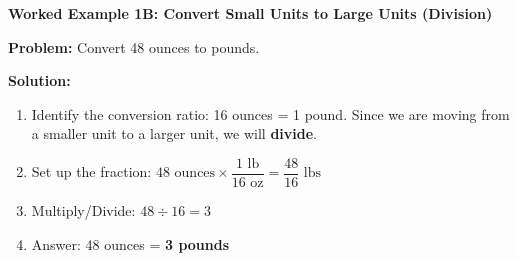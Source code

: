 \documentclass[12pt, letterpaper, fleqn]{article}
\begin{document}
\begin{tcolorbox}[colback=white, colframe=black!25, boxrule=0.6pt, arc=4mm, left=6mm, right=6mm, top=5mm, bottom=5mm]

\textbf{Worked Example 1B: Convert Small Units to Large Units (Division)}

\medskip

\textbf{Problem:} Convert 48 ounces to pounds.

\medskip
\vspace{1cm}

\noindent
\textbf{Solution:}

\begin{enumerate}
    \item Identify the conversion ratio: 16 ounces = 1 pound. Since we are moving from a smaller unit to a larger unit, we will \textbf{divide}.
    \vspace{1cm}
    
    \item Set up the fraction: $48 \text{ ounces} \times \dfrac{1 \text{ lb}}{16 \text{ oz}} = \dfrac{48}{16} \text{ lbs}$
    \vspace{1cm}
    
    \item Multiply/Divide: $48 \div 16 = 3$
    \vspace{1cm}
    
    \item Answer: 48 ounces = \textbf{3 pounds}
    
\end{enumerate}

\end{tcolorbox}

\vspace{4mm}
\end{document}
